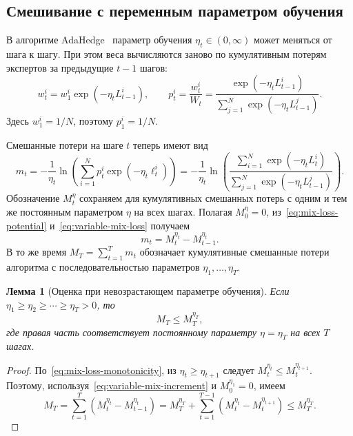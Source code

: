 \documentclass[a4paper,12pt]{article}
\theoremstyle{plain}
\newtheorem*{lemma}{Лемма}
\theoremstyle{definition}
\theoremstyle{remark}
\numberwithin{equation}{section}
\begin{document}
\subsection{Смешивание с переменным параметром обучения}

В алгоритме AdaHedge~\cite{AdaHedge} параметр обучения $\eta_t \in (0,\infty)$ может меняться от шага к шагу. При этом веса вычисляются заново по кумулятивным потерям экспертов за предыдущие $t-1$ шагов:
\[
w_t^i = w_1^i\exp\left(-\eta_t L_{t-1}^i\right),
\qquad
p_t^i = \frac{w_t^i}{W_t}
      = \frac{\exp\left(-\eta_t L_{t-1}^i\right)}
             {\sum_{j=1}^{N}\exp\left(-\eta_t L_{t-1}^j\right)}.
\]
Здесь $w_1^i = 1/N$, поэтому $p_1^i=1/N$.

Смешанные потери на шаге $t$ теперь имеют вид
\begin{equation}
\label{eq:variable-mix-loss}
m_t
= -\frac{1}{\eta_t}\ln\left(
    \sum_{i=1}^{N}p_t^i\exp\left(-\eta_t\ell_t^i\right)
  \right)
= -\frac{1}{\eta_t}\ln\left(
    \frac{\sum_{i=1}^{N}\exp\left(-\eta_t L_t^i\right)}
         {\sum_{j=1}^{N}\exp\left(-\eta_t L_{t-1}^j\right)}
  \right).
\end{equation}
Обозначение $M_t^\eta$ сохраняем для кумулятивных смешанных потерь с одним и тем же постоянным параметром $\eta$ на всех шагах. Полагая $M_0^\eta=0$, из~\eqref{eq:mix-loss-potential} и~\eqref{eq:variable-mix-loss} получаем
\begin{equation}
\label{eq:variable-mix-increment}
m_t = M_t^{\eta_t} - M_{t-1}^{\eta_t}.
\end{equation}
В то же время $M_T=\sum_{t=1}^{T}m_t$ обозначает кумулятивные смешанные потери алгоритма с последовательностью параметров $\eta_1,\ldots,\eta_T$.

\begin{lemma}[Оценка при невозрастающем параметре обучения]
Если $\eta_1 \geqslant \eta_2 \geqslant \cdots \geqslant \eta_T > 0$, то
\begin{equation}
\label{eq:variable-mix-bound}
M_T \leqslant M_T^{\eta_T},
\end{equation}
где правая часть соответствует постоянному параметру $\eta=\eta_T$ на всех $T$ шагах.
\end{lemma}

\begin{proof}
По~\eqref{eq:mix-loss-monotonicity}, из $\eta_t\geqslant\eta_{t+1}$ следует $M_t^{\eta_t}\leqslant M_t^{\eta_{t+1}}$. Поэтому, используя~\eqref{eq:variable-mix-increment} и $M_0^{\eta_1}=0$, имеем
\[
M_T
= \sum_{t=1}^{T}\left(M_t^{\eta_t}-M_{t-1}^{\eta_t}\right)
= M_T^{\eta_T}
 + \sum_{t=1}^{T-1}\left(M_t^{\eta_t}-M_t^{\eta_{t+1}}\right)
\leqslant M_T^{\eta_T}.
\]
\end{proof}
\end{document}
